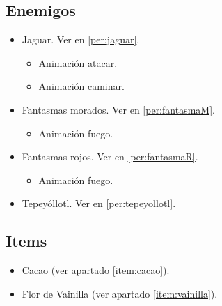 	\subsection{Enemigos}
	\begin{itemize}
		\item Jaguar. Ver en \ref{per:jaguar}.
			\begin{itemize}
				\item Animación atacar.
				\item Animación caminar.
			\end{itemize}
		\item Fantasmas morados. Ver en \ref{per:fantasmaM}.
			\begin{itemize}
				\item Animación fuego.
			\end{itemize}
		\item Fantasmas rojos. Ver en \ref{per:fantasmaR}.
			\begin{itemize}
				\item Animación fuego.
			\end{itemize}
		\item Tepeyóllotl. Ver en \ref{per:tepeyollotl}.
	\end{itemize}
	\subsection{Items}
	\begin{itemize}
        \item   Cacao (ver apartado \ref{item:cacao}).
        \item Flor de Vainilla (ver apartado \ref{item:vainilla}).
\end{itemize}
